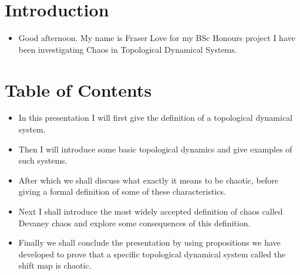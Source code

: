 \documentclass{article}
\begin{document}
    \setcounter{section}{0}
    \section{Introduction}
    \begin{itemize}
        \item Good afternoon. My name is Fraser Love for my BSc Honours project I have been investigating Chaos in Topological Dynamical Systems.
    \end{itemize}

    \section{Table of Contents}
    \begin{itemize}
        \item In this presentation I will first give the definition of a topological dynamical system.
        \item Then I will introduce some basic topological dynamics and give examples of such systems.
        \item After which we shall discuss what exactly it means to be chaotic, before giving a formal definition of some of these characteristics.
        \item Next I shall introduce the most widely accepted definition of chaos called Devaney chaos and explore some consequences of this definition.
        \item Finally we shall conclude the presentation by using propositions we have developed to prove that a specific topological dynamical system called the shift map is chaotic.
    \end{itemize}
\end{document}
